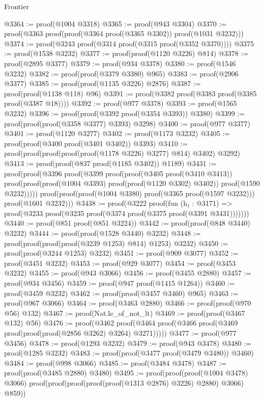 \begin{lexlean}{Frontier}
\begin{coremodule}
@3364 := proof(@1004 @3318)
@3365 := proof(@943 @3304)
@3370 := proof(@3363 proof(proof(@3364 proof(@3365 @3302)) proof(@1031 @3232)))
@3374 := proof(@3243 proof(@3314 proof(@3315 proof(@3352 @3370))))
@3375 := proof(@1538 @3232)
@3377 := proof(proof(@1120 @3226) @814)
@3378 := proof(@2895 @3377)
@3379 := proof(@934 @3378)
@3380 := proof(@1546 @3232)
@3382 := proof(proof(@3379 @3380) @965)
@3383 := proof(@2906 @3377)
@3385 := proof(proof(@1135 @3226) @2876)
@3387 := proof(proof(@1138 @118) @96)
@3391 := proof(@3382 proof(@3383 proof(@3385 proof(@3387 @18))))
@3392 := proof(@977 @3378)
@3393 := proof(@1565 @3232)
@3396 := proof(proof(@3392 proof(@3354 @3393)) @3380)
@3399 := proof(proof(proof(@3358 @3377) @3393) @3298)
@3400 := proof(@977 @3377)
@3401 := proof(@1120 @3277)
@3402 := proof(@1173 @3232)
@3405 := proof(proof(@3400 proof(@3401 @3402)) @3393)
@3410 := proof(proof(proof(proof(proof(@1178 @3226) @3277) @814) @3402) @3292)
@3413 := proof(proof(@837 proof(@1185 @3402)) @1189)
@3431 := proof(proof(@3396
        proof(@3399
            proof(proof(@3405 proof(@3410 @3413))
                proof(proof(proof(@1004 @3393) proof(proof(@1120 @3302) @3402))
                    proof(@1590 @3232)))))
      proof(proof(proof(@1004 @3380) proof(@3365 proof(@1597 @3232))) proof(@1601 @3232)))
@3438 := proof(@3222
      proof(fun (h₁ : @3171) =>
        proof(@3233 proof(@3235 proof(@3374 proof(@3375 proof(@3391 @3431)))))))
@3440 := proof(@851 proof(@851 @3224))
@3442 := proof(proof(@848 @3440) @3232)
@3444 := proof(proof(@1528 @3440) @3232)
@3448 := proof(proof(proof(proof(@3239 @1253) @814) @1253) @3232)
@3450 := proof(proof(@3244 @1253) @3232)
@3451 := proof(@909 @3077)
@3452 := proof(@3451 @3232)
@3453 := proof(@929 @3077)
@3454 := proof(@3453 @3232)
@3455 := proof(@943 @3066)
@3456 := proof(@3455 @2880)
@3457 := proof(@934 @3456)
@3459 := proof(@947 proof(@1415 @1264))
@3460 := proof(@3459 @3232)
@3462 := proof(proof(@3457 @3460) @965)
@3463 := proof(@967 @3066)
@3464 := proof(@3463 @2880)
@3466 := proof(proof(@970 @56) @132)
@3467 := proof(Nat.le_of_not_lt)
@3469 := proof(proof(@3467 @132) @56)
@3476 := proof(@3462
      proof(@3464 proof(@3466 proof(@3469 proof(proof(proof(@2856 @3262) @3264) @3271)))))
@3477 := proof(@977 @3456)
@3478 := proof(@1293 @3232)
@3479 := proof(@943 @3478)
@3480 := proof(@1285 @3232)
@3483 := proof(proof(@3477 proof(@3479 @3480)) @3460)
@3484 := proof(@998 @3066)
@3485 := proof(@3484 @3478)
@3487 := proof(proof(@3485 @2880) @3480)
@3495 := proof(proof(proof(@1004 @3478) @3066)
      proof(proof(proof(proof(proof(@1313 @2876) @3226) @2880) @3066) @859))

\end{coremodule}
\end{lexlean}
